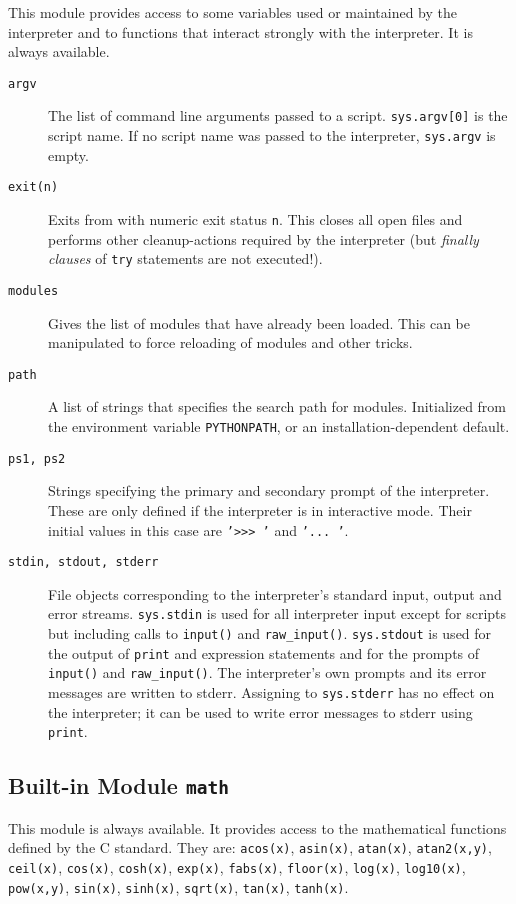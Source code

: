 This module provides access to some variables used or maintained by the
interpreter and to functions that interact strongly with the interpreter.
It is always available.
\begin{description}
\item[{\tt argv}]
The list of command line arguments passed to a {\Python} script.
{\tt sys.argv[0]}
is the script name.
If no script name was passed to the {\Python} interpreter,
{\tt sys.argv}
is empty.
\item[{\tt exit(n)}]
Exits from {\Python} with numeric exit status
{\tt n}.
This closes all open files and performs other cleanup-actions required by
the interpreter (but
{\em finally clauses}
of
{\tt try}
statements are not executed!).
\item[{\tt modules}]
Gives the list of modules that have already been loaded.
This can be manipulated to force reloading of modules and other tricks.
\item[{\tt path}]
A list of strings that specifies the search path for modules.
Initialized from the environment variable {\tt PYTHONPATH}, or an
installation-dependent default.
\item[{\tt ps1,~ps2}]
Strings specifying the primary and secondary prompt of the interpreter.
These are only defined if the interpreter is in interactive mode.
Their initial values in this case are
{\tt '>>> '}
and
{\tt '... '}.
\item[{\tt stdin, stdout, stderr}]
File objects corresponding to the interpreter's standard input, output
and error streams.
{\tt sys.stdin}
is used for all interpreter input except for scripts but including calls
to
{\tt input()}
and
{\tt raw\_input()}.
{\tt sys.stdout}
is used for the output of
{\tt print} and expression statements
and for the prompts of
{\tt input()}
and
{\tt raw\_input()}.
The interpreter's own prompts and its error messages are written to
stderr.
Assigning to
{\tt sys.stderr}
has no effect on the interpreter; it can be used to write error messages
to stderr using
{\tt print}.
\end{description}

\subsection{Built-in Module {\tt math}}

This module is always available.
It provides access to the mathematical functions defined by the C
standard.
They are:
{\tt acos(x)},
{\tt asin(x)},
{\tt atan(x)},
{\tt atan2(x,y)},
{\tt ceil(x)},
{\tt cos(x)},
{\tt cosh(x)},
{\tt exp(x)},
{\tt fabs(x)},
{\tt floor(x)},
{\tt log(x)},
{\tt log10(x)},
{\tt pow(x,y)},
{\tt sin(x)},
{\tt sinh(x)},
{\tt sqrt(x)},
{\tt tan(x)},
{\tt tanh(x)}.

